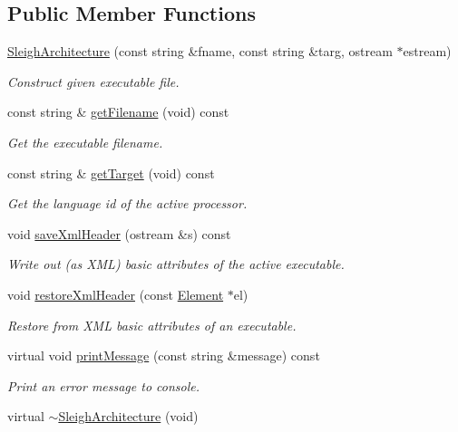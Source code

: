 \subsection*{Public Member Functions}
\begin{DoxyCompactItemize}
\item 
\mbox{\hyperlink{class_sleigh_architecture_a12a9640c1af6674cd346a2b2a4bd1b5f}{Sleigh\+Architecture}} (const string \&fname, const string \&targ, ostream $\ast$estream)
\begin{DoxyCompactList}\small\item\em Construct given executable file. \end{DoxyCompactList}\item 
const string \& \mbox{\hyperlink{class_sleigh_architecture_a67332981b2508f16d902ba1884329832}{get\+Filename}} (void) const
\begin{DoxyCompactList}\small\item\em Get the executable filename. \end{DoxyCompactList}\item 
const string \& \mbox{\hyperlink{class_sleigh_architecture_ac1f7860991c903a87cc9df4a8a6130c2}{get\+Target}} (void) const
\begin{DoxyCompactList}\small\item\em Get the {\itshape language} {\itshape id} of the active processor. \end{DoxyCompactList}\item 
void \mbox{\hyperlink{class_sleigh_architecture_a0ac133adbc1162fe2baeba1c897dfc34}{save\+Xml\+Header}} (ostream \&s) const
\begin{DoxyCompactList}\small\item\em Write out (as X\+ML) basic attributes of the active executable. \end{DoxyCompactList}\item 
void \mbox{\hyperlink{class_sleigh_architecture_a9edbac231d5ec6639f02e5888db24943}{restore\+Xml\+Header}} (const \mbox{\hyperlink{class_element}{Element}} $\ast$el)
\begin{DoxyCompactList}\small\item\em Restore from X\+ML basic attributes of an executable. \end{DoxyCompactList}\item 
virtual void \mbox{\hyperlink{class_sleigh_architecture_a70cc8c22ebab95cf41ab21b7d886c08f}{print\+Message}} (const string \&message) const
\begin{DoxyCompactList}\small\item\em Print an error message to console. \end{DoxyCompactList}\item 
virtual \mbox{\hyperlink{class_sleigh_architecture_a6c1b55e945e4614366a38689e02556ed}{$\sim$\+Sleigh\+Architecture}} (void)
\end{DoxyCompactItemize}
